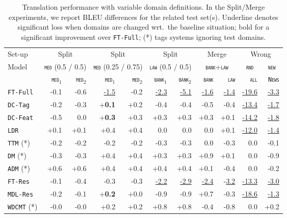 \documentclass[11pt,a4paper]{article}
\newcommand{\fyDone}[1]{\done[FY]\Todo[FY:]{\textcolor{orange}{#1}}}
\newcommand{\jcDone}[1]{\done[JC]\Todo[JC:]{\textcolor{red}{#1}}}
\newcommand{\revision}[1]{#1}
\newcommand{\domain}[1]{\texttt{\textsc{#1}}}
\newcommand{\system}[1]{\texttt{{#1}}}
\newcommand{\SB}[1]{\textbf{#1}}
\newcommand{\SW}[1]{\underline{#1}}
\begin{document}
\begin{table*}
  \centering%
  \begin{tabular}{|p{1.8cm}|*{10}{r|}} \hline
    \hfill Set-up & \multicolumn{2}{c|}{Split} &  \multicolumn{2}{c|}{Split} & \multicolumn{2}{c|}{Split} & \multicolumn{2}{c|}{Merge} & \multicolumn{2}{c|}{Wrong} \\ %
     Model \hfill & \multicolumn{2}{c|}{\domain{med} \footnotesize{(0.5 / 0.5)}} &  \multicolumn{2}{c|}{\domain{med} {\footnotesize (0.25 / 0.75)}} & \multicolumn{2}{c|}{\domain{law} {\footnotesize (0.5 / 0.5)}} & \multicolumn{2}{c|}{\domain{bank}+\domain{law}} &  \multicolumn{1}{c|}{\domain{rnd}} &  \multicolumn{1}{c|}{\domain{new}}\\ \hline
    & \domain{med}$_1$ & \domain{med}$_2$ & \domain{med}$_1$ & \domain{med}$_2$ &  \domain{bank}$_1$ & \domain{bank}$_2$ & \domain{bank} & \domain{law}   & \domain{all} & \domain{News} \\
    \system{FT-Full}      & -0.1 & -0.6 & \SW{-1.5} & -0.2& \SW{-2.3} & \SW{-5.1} &\SW{-1.6} & \SW{-1.4}& \SW{-19.6} & \SW{-3.3}\\%
    \system{DC-Tag}     & -0.2 & -0.3& +\SB{0.1}  & +0.2& -0.4 & -0.4 & -0.5 & -0.4 & \SW{-13.4} & \SW{-1.7}\\%
    \system{DC-Feat}    & -0.5 & 0.0 & +\SB{0.3}   & +0.3 & +0.3 & +0.3 & +0.3 & +0.1 & \SW{-14.2} &\SW{-1.8}\\ %
    \system{LDR}           & +0.1 & +0.1 & +0.4 & +0.4 & 0.0 &  0.0 &  0.0 & +0.1& \SW{-12.0} & \SW{-1.4}\\ %
    \system{TTM} (*)        & -0.2 &  -0.2 & -0.2 & -0.2 & -0.3 &-0.3 &  0.0 & -0.3 & 0.0 & -0.1\\
    \system{DM} (*)           & -0.3   & -0.3  & +0.4 & +0.4 & +0.3 & +0.3 & +0.9 & +0.1 & 0.0 &-0.9\\
    \system{ADM} (*)        & +0.6   & +0.6 & +0.4 & +0.4 & +0.4 & +0.4 &  +0.1 & -0.4 & 0.0&-0.2\\
    \revision{\system{FT-Res}}   & -0.1   & -0.4 & -0.3 &-0.3 & \SW{-2.2} & \SW{-2.9} & \SW{-2.4} & -\SW{3.2} & \SW{-13.3} & \SW{-3.0}\\ %
    \system{MDL-Res}   & -0.2   & -0.1 & +\SB{0.2} &+0.0 & -0.9 & -0.9 & +0.7 & -0.3 & \SW{-18.6} & \SW{-1.3}\\ %
    \system{WDCMT} (*)     & -0.0    & -0.0  & +0.2 & +0.2  & +0.8 & +0.8  & -0.4 & -0.8 & 0.0 & +0.2 \\
    \hline
  \end{tabular}
  \caption{Translation performance with variable domain definitions. In the Split/Merge experiments, we report BLEU differences for the related test set(s). Underline denotes significant loss when domains are changed wrt.\ the baseline situation; bold for a significant improvement over \system{FT-Full}; (*) tags systems ignoring test domains.
    \fyDone{Check wrong and significance of diff for ``old''}\fyDone{How about wrong ?}\jcDone{FTres results are odd... split LAW 0.5}
  }
  \label{tab:redomains}
\end{table*}
\end{document}
